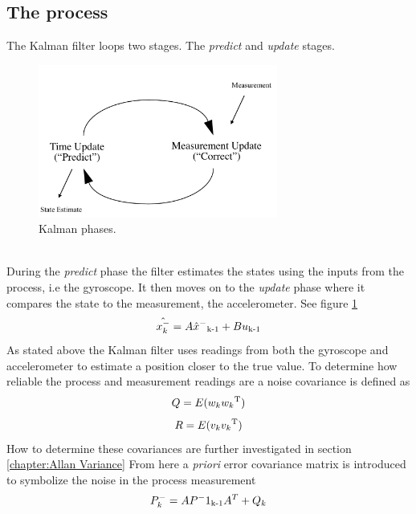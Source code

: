 \documentclass[a4paper,11pt]{kth-mag}
\begin{document}
\subsection{The process} 
The Kalman filter loops two stages. The \textit{predict} and \textit{update} stages.
\begin{figure}[!htb] 
\centering
\includegraphics[width = 0.7\textwidth]{Kalmanphasepic.jpg}
\caption{Kalman phases.}
\label{figure : Kalman phases}
\end{figure}
\\ During the \textit{predict} phase the filter estimates the states using the inputs from the process, i.e the gyroscope. It then moves on to the \textit{update} phase where it compares the state to the measurement, the accelerometer. See figure \ref{figure : Kalman phases}
\begin{equation} \label{eq:Kalman first estimate}
\hat{x^-_k} = A\hat{x}^-\textsubscript{k-1}+Bu\textsubscript{k-1}
\end{equation}
As stated above the Kalman filter uses readings from both the gyroscope and accelerometer to estimate a position closer to the true value. To determine how reliable the process and measurement readings are a noise covariance is defined as
\begin{equation} \label{eq:covariance process noise}
Q = E(w_k w_k \textsuperscript{T})
\end{equation}
\begin{equation} \label{eq:covariance measurement noise}
R = E(v_k v_k \textsuperscript{T} )
\end{equation}
How to determine these covariances are further investigated in section  \ref{chapter:Allan Variance}
From here a \textit{priori} error covariance matrix is introduced to symbolize the noise in the process measurement
\begin{equation}
P^-_k = AP^-1\textsubscript{k-1}A^T + Q_k
\end{equation}
\end{document}
